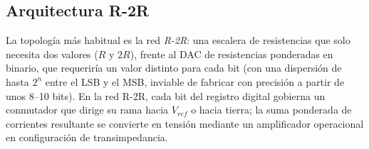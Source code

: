 \subsection{Arquitectura R-2R}\label{sec:dac_r2r}

La topología más habitual es la red \emph{R-2R}: una escalera de resistencias que solo necesita dos valores (\(R\) y \(2R\)), frente al DAC de resistencias ponderadas en binario, que requeriría un valor distinto para cada bit (con una dispersión de hasta \(2^n\) entre el LSB y el MSB, inviable de fabricar con precisión a partir de unos 8--10 bits). En la red R-2R, cada bit del registro digital gobierna un conmutador que dirige su rama hacia $V_{ref}$ o hacia tierra; la suma ponderada de corrientes resultante se convierte en tensión mediante un amplificador operacional en configuración de transimpedancia.


